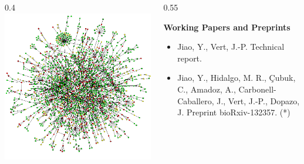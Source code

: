\documentclass[xcolor=x11names,compress]{beamer}
\theoremstyle{plain}
\renewcommand{\(}{\begin{columns}}
\renewcommand{\)}{\end{columns}}
\newcommand{\<}[1]{\begin{column}{#1}}
\renewcommand{\>}{\end{column}}
\newcommand{\addsectiontitlepage}{
	\hfill\leavevmode
  \vtop{
    \huge\hbox{\color{myblue}\insertsection}
    \kern.5ex %
    \vspace{1cm}
  }
}
\begin{document}
\begin{frame}
	
	\addsectiontitlepage
	
	\(
	\<{0.4\linewidth}
		\includegraphics[width=\columnwidth]{slides/ppi}
	\>
	
	\<{0.55\linewidth}
	\begin{footnotesize}
	\textbf{Working Papers and Preprints}
	\begin{itemize}
		\item \nocite{Jiao2017Network} Jiao, Y., Vert, J.-P. Technical report.
		\item \nocite{Jiao2017Signaling} Jiao, Y., Hidalgo, M. R., \c{C}ubuk, C., Amadoz, A., Carbonell-Caballero, J., Vert, J.-P., Dopazo, J. Preprint bioRxiv-132357. (*)
	\end{itemize}
	\end{footnotesize}
	\>
	\)
	
\end{frame}
\end{document}
